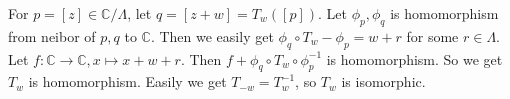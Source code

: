 \documentclass{ctexart}
\begin{document}
\begin{solution}
  For \(p=[z]\in \mathbb{C} / \Lambda\), let \(q=[z+w]=T_w([p])\).
  Let \(\phi_p,\phi_q\) is homomorphism from neibor of \(p,q\) to \(\mathbb{C}\). Then we easily get \(\phi_q \circ T_w-\phi_p=w+r\) for some \(r \in \Lambda\).
  Let \(f:\mathbb{C} \to \mathbb{C},x \mapsto x+w+r\). Then \(f+\phi_q \circ T_w \circ \phi_p^{-1}\) is homomorphism.
  So we get \(T_w\) is homomorphism.
  Easily we get \(T_{-w}=T_w^{-1}\), so \(T_w\) is isomorphic.
\end{solution}
\end{document}
